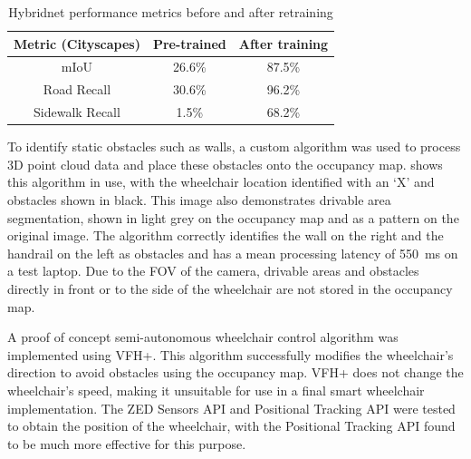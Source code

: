 \documentclass[10pt,twoside]{article}
\begin{document}
\setlength{\textfloatsep}{10pt}
\setlength{\floatsep}{10pt}
\setlength{\intextsep}{10pt}

\setlength{\abovecaptionskip}{10pt}
\setlength{\belowcaptionskip}{0pt}
\begin{table}
    \caption{Hybridnet performance metrics before and after retraining}
    \label{table:retraining}
    \begin{tabular}{c c c}
    \toprule
    Metric (Cityscapes) & Pre-trained & After training \\
    \midrule
    mIoU & 26.6\% & 87.5\% \\
    Road Recall & 30.6\% & 96.2\% \\
    Sidewalk Recall & 1.5\% & 68.2\% \\
    \bottomrule
    \end{tabular}
\end{table}

To identify static obstacles such as walls, a custom algorithm was used to process 3D point cloud data
and place these obstacles onto the occupancy map.
 shows this algorithm in use,
with the wheelchair location identified with an `X' and obstacles shown in black.
This image also demonstrates drivable area segmentation, shown in light grey on the
occupancy map and as a pattern on the original image.
The algorithm correctly identifies the wall on the right and the handrail on the left as obstacles
and has a mean processing latency of \SI{550}{\milli\second} on a test laptop.
Due to the FOV of the camera, drivable areas and obstacles directly in front or to the side of
the wheelchair are not stored in the occupancy map.

A proof of concept semi-autonomous wheelchair control algorithm was implemented using VFH+.
This algorithm successfully modifies the wheelchair's direction to avoid obstacles using the
occupancy map. VFH+ does not change the wheelchair's speed, making it unsuitable
for use in a final smart wheelchair implementation.
The ZED Sensors API and Positional Tracking API were tested to obtain the position of the wheelchair,
with the Positional Tracking API found to be much more effective for this purpose.
\end{document}
